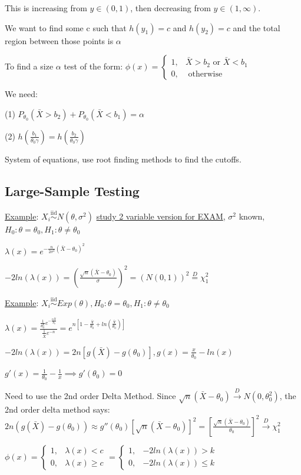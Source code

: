 \documentclass{article}
\newcommand{\dto}{\overset{D}{\to}}
\newcommand{\iiddist}{\overset{\mathrm{iid}}{\sim}}
\begin{document}
This is increasing from $y \in (0, 1)$, then decreasing from $y \in (1, \infty)$. 

We want to find some c such that $h(y_1) = c$ and $h(y_2) = c$ and the total region between those points is $\alpha$

To find a size $\alpha$ test of the form: $\phi(x) = \begin{cases} 1, & \bar{X} > b_2 \text{ or } \bar{X} < b_1 \\ 0, & \text{ otherwise} \end{cases}$

We need:

(1) $P_{\theta_0}(\bar{X} > b_2) + P_{\theta_0}(\bar{X} < b_1) = \alpha$

(2) $h(\frac{b_1}{\theta_0 \gamma}) = h(\frac{b_2}{\theta_0 \gamma})$

System of equations, use root finding methods to find the cutoffs.

\subsection{Large-Sample Testing}

\underline{Example}: $X_i \iiddist N(\theta, \sigma^2)$ \underline{study 2 variable version for EXAM}, $\sigma^2$ known, $H_0: \theta = \theta_0, H_1: \theta \neq \theta_0$

$\lambda(x) = e^{-\frac{n}{2\sigma^2}(\bar{X} - \theta_0)^2}$

$-2ln(\lambda(x)) = (\frac{\sqrt{n}(\bar{X} - \theta_0)}{\sigma})^2 = (N(0, 1))^2 \overset{D}{=} \chi^2_1$

\underline{Example}: $X_i \iiddist Exp(\theta), H_0: \theta = \theta_0, H_1: \theta \neq \theta_0$

$\lambda(x) = \frac{\frac{1}{\theta_0^n}e^{-\frac{n\bar{X}}{\theta_0}}}{\frac{1}{\bar{X}}e^{-n}} = e^{n[1 - \frac{\bar{X}}{\theta_0} + ln(\frac{\bar{X}}{\theta_0})]}$

$-2ln(\lambda(x)) = 2n[g(\bar{X}) - g(\theta_0)], g(x) = \frac{x}{\theta_0} - ln(x)$

$g'(x) = \frac{1}{\theta_0} - \frac{1}{x} \implies g'(\theta_0) = 0$

Need to use the 2nd order Delta Method. Since $\sqrt{n}(\bar{X} - \theta_0) \dto N(0, \theta_0^2)$, the 2nd order delta method says: $2n(g(\bar{X}) - g(\theta_0)) \approx g''(\theta_0)[\sqrt{n}(\bar{X} - \theta_0)]^2 = [\frac{\sqrt{n}(\bar{X} - \theta_0)}{\theta_0}]^2 \dto \chi^2_1$

$\phi(x) = \begin{cases} 1, & \lambda(x) < c \\ 0, & \lambda(x) \ge c \end{cases} = \begin{cases} 1, & -2ln(\lambda(x)) > k \\ 0, & -2ln(\lambda(x)) \le k \end{cases}$
\end{document}
